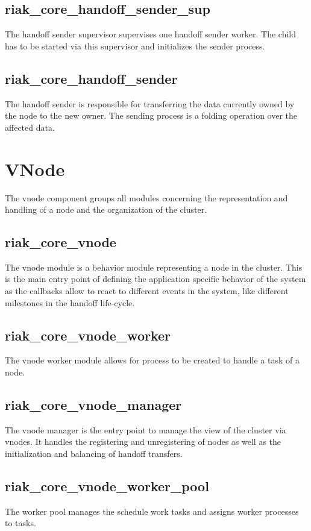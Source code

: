 	\subsection{riak\_core\_handoff\_sender\_sup}
		The handoff sender supervisor supervises one handoff sender worker.
		The child has to be started via this supervisor and initializes the sender process.
	
	\subsection{riak\_core\_handoff\_sender}
		The handoff sender is responsible for transferring the data currently owned by the node to the new owner.
		The sending process is a folding operation over the affected data.
	

\section{VNode}
	The vnode component groups all modules concerning the representation and handling of a node and the organization of the cluster.
	\subsection{riak\_core\_vnode}
		The vnode module is a behavior module representing a node in the cluster.
		This is the main entry point of defining the application specific behavior of the system as the callbacks allow to react to different events in the system, like different milestones in the handoff life-cycle.
	
	\subsection{riak\_core\_vnode\_worker}
		The vnode worker module allows for process to be created to handle a task of a node.
	
	\subsection{riak\_core\_vnode\_manager}
		The vnode manager is the entry point to manage the view of the cluster via vnodes.
		It handles the registering and unregistering of nodes as well as the initialization and balancing of handoff transfers.
	
	\subsection{riak\_core\_vnode\_worker\_pool}
		The worker pool manages the schedule work tasks and assigns worker processes to tasks.
	
